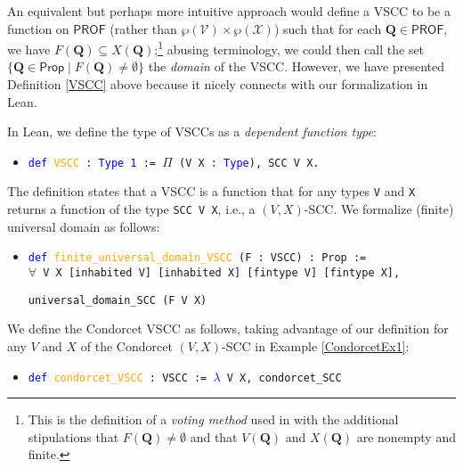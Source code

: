 \documentclass[runningheads]{llncs}
\begin{document}
\noindent An equivalent but perhaps more intuitive approach would define a VSCC to be a function on $\mathsf{PROF}$ (rather than $\wp(\mathcal{V})\times\wp(\mathcal{X})$) such that for each $\mathbf{Q}\in\mathsf{PROF}$, we have $F(\mathbf{Q})\subseteq X(\mathbf{Q})$;\footnote{This is the definition of a \textit{voting method} used in \cite{HP2020} with the additional stipulations that $F(\mathbf{Q})\neq\emptyset$ and  that $V(\mathbf{Q})$ and $X(\mathbf{Q})$ are nonempty and finite.} abusing terminology, we could then call the set $\{\mathbf{Q}\in\mathsf{Prop}\mid F(\mathbf{Q})\neq\emptyset\}$ the \emph{domain} of the VSCC. However, we have presented Definition \ref{VSCC} above because it nicely connects with our formalization in Lean.



In Lean, we define the type of VSCCs as a \textit{dependent function type}:
\begin{itemize}
\item[] \texttt{\textcolor{blue}{def} \textcolor{orange}{VSCC} : \textcolor{blue}{Type 1} := $\Pi$ (V X : \textcolor{blue}{Type}), SCC V X.}
\end{itemize}
The definition states that a VSCC is a function that for any types \texttt{V} and \texttt{X} returns a function of the type \texttt{SCC V X}, i.e., a $(V,X)$-SCC. We formalize (finite) universal domain as follows:
\begin{itemize}
\item[] \texttt{\textcolor{blue}{def} \textcolor{orange}{finite\_universal\_domain\_VSCC} (F : VSCC) : Prop :=}\\
    \texttt{$\forall$ V X [inhabited V] [inhabited X] [fintype V] [fintype X],}
    
    \texttt{universal\_domain\_SCC (F V X)}
\end{itemize}

\begin{example} We define the Condorcet VSCC as follows, taking advantage of our definition for any $V$ and $X$ of the Condorcet $(V,X)$-SCC in Example \ref{CondorcetEx1}:
\begin{itemize}
\item[] \texttt{\textcolor{blue}{def} \textcolor{orange}{condorcet\_VSCC} : VSCC := \textcolor{blue}{$\lambda$} V X, condorcet\_SCC}
\end{itemize}
\end{example}
\end{document}
